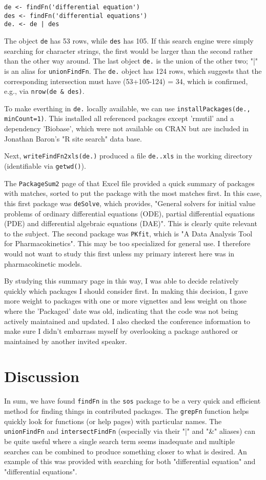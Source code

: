 \begin{verbatim}
de <- findFn('differential equation') 
des <- findFn('differential equations')
de. <- de | des 
\end{verbatim}

The object {\tt de} has 53 rows, while {\tt des} has 105.  
If this search engine were simply searching for character 
strings, the first would be larger than the second rather than 
the other way around.  The last object {\tt de.} is the union
of the other two;  "|" is an alias for {\tt unionFindFn}.  
The {\tt de.} object has 124 rows, which suggests that 
the corresponding intersection must have (53+105-124) = 34, which 
is confirmed, e.g., via {\tt nrow(de \& des)}.  

To make everthing in {\tt de.} locally available, we can use 
{\tt installPackages(de., minCount=1)}.  This installed all 
referenced packages except 'rmutil' and a dependency 'Biobase', 
which were not available on CRAN but are included in Jonathan 
Baron's "R site search" data base.  

Next, {\tt writeFindFn2xls(de.)} produced a file {\tt de..xls} 
in the working directory (identifiable via {\tt getwd()}).  

The {\tt PackageSum2} page of that Excel file provided a quick 
summary of packages with matches, sorted to put the package 
with the most matches first.  In this case, this first package 
was {\tt deSolve}, which provides, "General solvers for initial 
value problems of ordinary differential equations (ODE), 
partial differential equations (PDE) and differential 
algebraic equations (DAE)".  This is clearly quite relevant 
to the subject.  The second package was {\tt PKfit}, which 
is "A Data Analysis Tool for Pharmacokinetics".  This may 
be too specialized for general use.  I therefore would not 
want to study this first unless my primary interest here was in 
pharmacokinetic models.  

By studying this summary page in this way, I was able to decide 
relatively quickly which packages I should consider first.  In 
making this decision, I gave more weight to packages with 
one or more vignettes and less weight on those where the 
'Packaged' date was old, indicating that the code was not being 
actively maintained and updated.  I also checked the conference 
information to make sure I didn't embarrass myself by overlooking 
a package authored or maintained by another invited speaker.  


\section*{Discussion}
In sum, we have found {\tt findFn} in the {\tt sos} package to
be a very quick and efficient method for finding things in
contributed packages.  The {\tt grepFn} function helps quickly 
look for functions (or help pages) with particular names.  
The {\tt unionFindFn} and {\tt intersectFindFn} (especially via 
their "|" and "\&" aliases) can be quite useful where a single 
search term seems inadequate and multiple searches can be 
combined to produce something closer to what is desired.  
An example of this was provided with searching for both
"differential equation" and "differential equations".  

